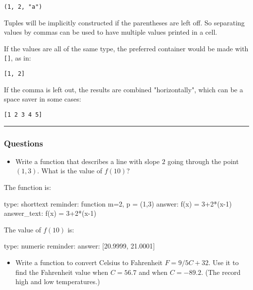 \documentclass[12pt]{article}
\begin{document}
\begin{verbatim}
(1, 2, "a")
\end{verbatim}
Tuples will be implicitly constructed if the parentheses are left off.
So separating values by commas can be used to have multiple values
printed in a cell.

If the values are all of the same type, the preferred container would be
made with \texttt{{[}{]}}, as in:



\begin{verbatim}
[1, 2]
\end{verbatim}
If the comma is left out, the results are combined "horizontally", which
can be a space saver in some cases:



\begin{verbatim}
[1 2 3 4 5]
\end{verbatim}
\begin{center}\rule{3in}{0.4pt}\end{center}

\subsubsection{Questions}

\begin{itemize}
\itemsep1pt\parskip0pt
\item
  Write a function that describes a line with slope $2$ going through
  the point $(1,3)$. What is the value of $f(10)$?
\end{itemize}

The function is:

\begin{answer}
type: shorttext
reminder: function m=2, p = (1,3)
answer: f(x) = 3+2*(x-1)
answer_text: f(x) = 3+2*(x-1) 
\end{answer}

The value of $f(10)$ is:

\begin{answer}
    type: numeric
    reminder: 
    answer: [20.9999, 21.0001]

\end{answer}

\begin{itemize}
\itemsep1pt\parskip0pt
\item
  Write a function to convert Celsius to Fahrenheit $F=9/5 C +   32$.
  Use it to find the Fahrenheit value when $C=56.7$ and when $C=-89.2$.
  (The record high and low temperatures.)
\end{itemize}
\end{document}
